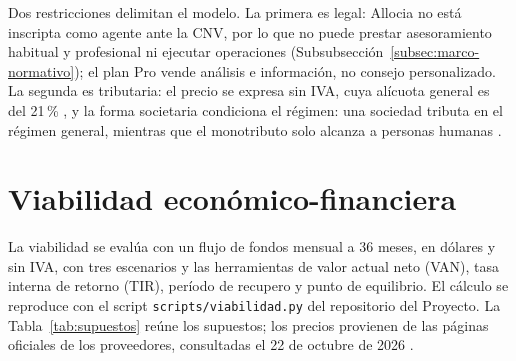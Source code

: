 Dos restricciones delimitan el modelo. La primera es legal: Allocia no está inscripta como agente ante la CNV, por lo que no puede prestar asesoramiento habitual y profesional ni ejecutar operaciones (Subsubsección~\ref{subsec:marco-normativo}); el plan Pro vende análisis e información, no consejo personalizado. La segunda es tributaria: el precio se expresa sin IVA, cuya alícuota general es del 21\,\% \parencite{LeyIVA}, y la forma societaria condiciona el régimen: una sociedad tributa en el régimen general, mientras que el monotributo solo alcanza a personas humanas \parencite{LeyMonotributo}.

\section{Viabilidad económico-financiera}\label{sec:viabilidad}

La viabilidad se evalúa con un flujo de fondos mensual a 36 meses, en dólares y sin IVA, con tres escenarios y las herramientas de valor actual neto (VAN), tasa interna de retorno (TIR), período de recupero y punto de equilibrio. El cálculo se reproduce con el script \texttt{scripts/viabilidad.py} del repositorio del Proyecto. La Tabla~\ref{tab:supuestos} reúne los supuestos; los precios provienen de las páginas oficiales de los proveedores, consultadas el 22 de octubre de 2026 \parencite{RailwayPricing,VercelPricing,ExpoPricing,FinnhubPricing,CoinGeckoPricing,ResendPricing,AppleDeveloper,GooglePlayConsole,AnthropicPricing}.

